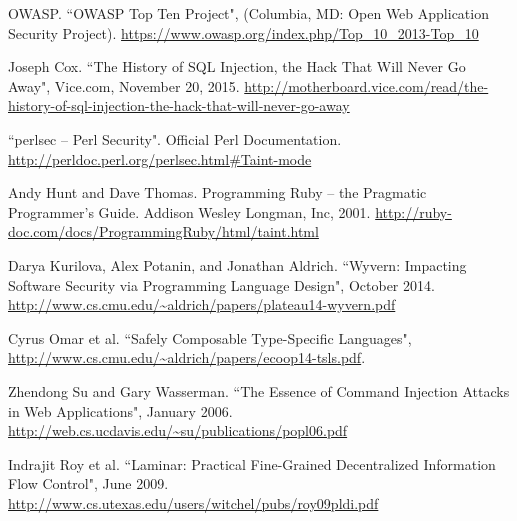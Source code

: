 \documentclass[twocolumn]{article}
\begin{document}
\begin{thebibliography}{9}

    OWASP.
    ``OWASP Top Ten Project", (Columbia, MD: Open Web Application Security Project).
    \url{https://www.owasp.org/index.php/Top_10_2013-Top_10}

    Joseph Cox.
    ``The History of SQL Injection, the Hack That Will Never Go Away",
    Vice.com, November 20, 2015.
    \url{http://motherboard.vice.com/read/the-history-of-sql-injection-the-hack-that-will-never-go-away}

    ``perlsec -- Perl Security".  Official Perl Documentation.
    \url{http://perldoc.perl.org/perlsec.html#Taint-mode}

    Andy Hunt and Dave Thomas.
    Programming Ruby -- the Pragmatic Programmer's Guide.
    Addison Wesley Longman, Inc, 2001.
    \url{http://ruby-doc.com/docs/ProgrammingRuby/html/taint.html}

    Darya Kurilova, Alex Potanin, and Jonathan Aldrich.
    ``Wyvern: Impacting Software Security via Programming Language Design",
    October 2014.
    \url{http://www.cs.cmu.edu/~aldrich/papers/plateau14-wyvern.pdf}

    Cyrus Omar et al.
    ``Safely Composable Type-Specific Languages",
    \url{http://www.cs.cmu.edu/~aldrich/papers/ecoop14-tsls.pdf}.

    Zhendong Su and Gary Wasserman.
    ``The Essence of Command Injection Attacks in Web Applications",
    January 2006.
    \url{http://web.cs.ucdavis.edu/~su/publications/popl06.pdf}

    Indrajit Roy et al.
    ``Laminar: Practical Fine-Grained Decentralized Information Flow Control",
    June 2009.
    \url{http://www.cs.utexas.edu/users/witchel/pubs/roy09pldi.pdf}


\end{thebibliography}
\end{document}
